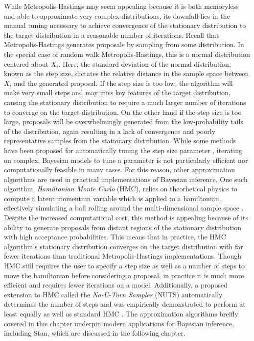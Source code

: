 \documentclass[
  12pt,
]{book}
\theoremstyle{definition}
\theoremstyle{definition}
\theoremstyle{definition}
\theoremstyle{remark}
\begin{document}
While Metropolis-Hastings may seem appealing because it is both memoryless and able to approximate very complex distributions, its downfall lies in the manual tuning necessary to achieve convergence of the stationary distribution to the target distribution in a reasonable number of iterations.
Recall that Metropolis-Hastings generates proposals by sampling from some distribution.
In the special case of random walk Metropolis-Hastings, this is a normal distribution centered about \(X_{i}\).
Here, the standard deviation of the normal distribution, known as the step size, dictates the relative distance in the sample space between \(X_{i}\) and the generated proposal.
If the step size is too low, the algorithm will make very small steps and may miss key features of the target distribution, causing the stationary distribution to require a much larger number of iterations to converge on the target distribution.
On the other hand if the step size is too large, proposals will be overwhelmingly generated from the low-probability tails of the distribution, again resulting in a lack of convergence and poorly representative samples from the stationary distribution.
While some methods have been proposed for automatically tuning the step size parameter \citep{Graves2011}, iterating on complex, Bayesian models to tune a parameter is not particularly efficient nor computationally feasible in many cases.
For this reason, other approximation algorithms are used in practical implementations of Bayesian inference.
One such algorithm, \emph{Hamiltonian Monte Carlo} (HMC), relies on theorhetical physics to compute a latent momentum variable which is applied to a hamiltonian, effectively simulating a ball rolling around the multi-dimensional sample space \citep{Brooks2011}.
Despite the increased computational cost, this method is appealing because of its ability to generate proposals from distant regions of the stationary distribution with high acceptance probabilities.
This means that in practice, the HMC algorithm's stationary distribution converges on the target distribution with far fewer iterations than traditional Metropolis-Hastings implementations.
Though HMC still requires the user to specify a step size as well as a number of steps to move the hamiltonian before considering a proposal, in practice it is much more efficient and requires fewer iterations on a model.
Additionally, a proposed extension to HMC called the \emph{No-U-Turn Sampler} (NUTS) automatically determines the number of steps and was empirically demonstrated to perform at least equally as well as standard HMC \citep{Homan2014}.
The approximation algorithms breifly covered in this chapter underpin modern applications for Bayesian inference, including Stan, which are discussed in the following chapter.
\end{document}

